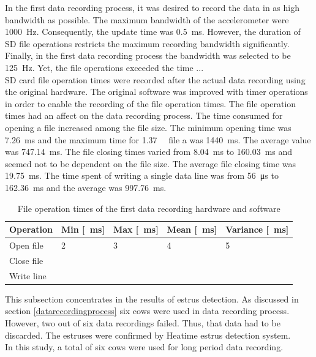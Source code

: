 \documentclass[english,12pt,a4paper,pdftex,elec,utf8]{aaltothesis}
\begin{document}
In the first data recording process, it was desired to record the data in as high bandwidth as possible. The maximum bandwidth of the accelerometer were \SI{1000}{\hertz}. Consequently, the update time was \SI{0.5}{\milli \second}. However, the duration of SD file operations restricts the maximum recording bandwidth significantly. Finally, in the first data recording process the bandwidth was selected to be \SI{125}{\hertz}. Yet, the file operations exceeded the time ... \\

SD card file operation times were recorded after the actual data recording using the original hardware. The original software was improved with timer operations in order to enable the recording of the file operation times. The file operation times had an affect on the data recording process. The time consumed for opening a file increased among the file size. The minimum opening time was \SI{7.26}{\milli\second} and the maximum time for \SI{1.37}{\giga \byte} file a was \SI{1440}{\milli \second}. The average value was \SI{747.14}{\milli \second}. The file closing times varied from \SI{8.04}{\milli \second} to \SI{160.03}{\milli \second} and seemed not to be dependent on the file size. The average file closing time was \SI{19.75}{\milli \second}. The time spent of writing a single data line was from \SI{56}{\micro \second} to \SI{162.36}{\milli\second} and the average was \SI{997.76}{\milli\second}. \\

\begin{table} \caption{File operation times of the first data recording hardware and software}
\centering
\begin{tabular}{| l | l | l | l | l |}
\hline
Operation & Min [\SI{}{\milli \second}] & Max [\SI{}{\milli \second}] & Mean [\SI{}{\milli \second}]& Variance [\SI{}{\milli \second}]\\ \hline
Open file & 2 & 3 & 4 & 5 \\ \hline
Close file &  &  &  &  \\ \hline
Write line &  &  &  &  \\ \hline
\end{tabular}
\end{table}




This subsection concentrates in the results of estrus detection. As discussed in section \ref{datarecordingprocess} six cows were used in data recording process. However, two out of six data recordings failed. Thus, that data had to be discarded. The estruses were confirmed by Heatime estrus detection system. \\
In this study, a total of six cows were used for long period data recording.
\end{document}
